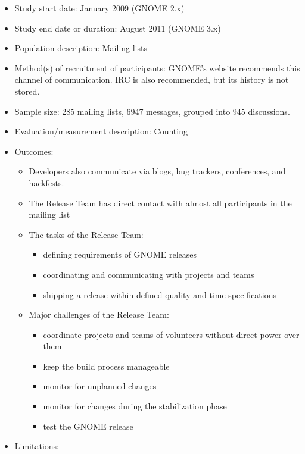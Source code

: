 \documentclass[]{book}
\providecommand{\tightlist}{%
  \setlength{\itemsep}{0pt}\setlength{\parskip}{0pt}}
\begin{document}
\begin{itemize}
\tightlist
\item
  Study start date: January 2009 (GNOME 2.x)
\item
  Study end date or duration: August 2011 (GNOME 3.x)
\item
  Population description: Mailing lists
\item
  Method(s) of recruitment of participants: GNOME's website recommends
  this channel of communication. IRC is also recommended, but its
  history is not stored.
\item
  Sample size: 285 mailing lists, 6947 messages, grouped into 945
  discussions.
\item
  Evaluation/measurement description: Counting
\item
  Outcomes:

  \begin{itemize}
  \tightlist
  \item
    Developers also communicate via blogs, bug trackers, conferences,
    and hackfests.
  \item
    The Release Team has direct contact with almost all participants in
    the mailing list
  \item
    The tasks of the Release Team:

    \begin{itemize}
    \tightlist
    \item
      defining requirements of GNOME releases
    \item
      coordinating and communicating with projects and teams
    \item
      shipping a release within defined quality and time specifications
    \end{itemize}
  \item
    Major challenges of the Release Team:

    \begin{itemize}
    \tightlist
    \item
      coordinate projects and teams of volunteers without direct power
      over them
    \item
      keep the build process manageable
    \item
      monitor for unplanned changes
    \item
      monitor for changes during the stabilization phase
    \item
      test the GNOME release
    \end{itemize}
  \end{itemize}
\item
  Limitations:


\end{itemize}
\end{document}

